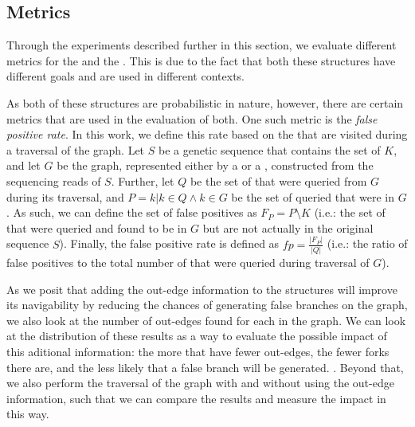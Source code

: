 \subsection{Metrics}

Through the experiments described further in this section, we evaluate different metrics for the \dBCM and the \dBHT. This is due to
the fact that both these structures have different goals and are used in different contexts.

As both of these structures are probabilistic in nature, however, there are certain metrics that are used in the evaluation of both.
One such metric is the \emph{false positive rate}. In this work, we define this rate based on the \kmers that are visited during a 
traversal of the graph. Let $S$ be a genetic sequence that contains the set of \kmers $K$, and let $G$ be the graph, represented
either by a \dBCM or a \dBHT, constructed from the sequencing reads of $S$. Further, let $Q$ be the set of \kmers that were queried
from $G$ during its traversal, and $P={k | k \in Q \wedge k \in G}$ be the set of queried \kmers that were in $G$. As such, we can
define the set of false positives as $F_P=P \setminus K$ (i.e.: the set of \kmers that were queried and found to be in $G$ but are not
actually in the original sequence $S$). Finally, the false positive rate is defined as $\mathit{fp}=\frac{|F_P|}{|Q|}$ (i.e.: the ratio of false
positives to the total number of \kmers that were queried during traversal of $G$).


As we posit that adding the out-edge information to the structures will improve its navigability by reducing the chances of generating
false branches on the graph, we also look at the number of out-edges found for each \kmer in the graph. We can look at the distribution
of these results as a way to evaluate the possible impact of this aditional information: the more \kmers that have fewer out-edges,
the fewer forks there are, and the less likely that a false branch will be generated. . Beyond that, we also perform the traversal of the graph with and
without using the out-edge information, such that we can compare the results and measure the impact in this way.

